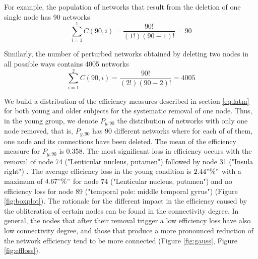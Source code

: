 \documentclass[12pt,a4paper]{article}
\begin{document}
For example, the population of networks that result from the deletion of one single node has 90 networks 
\begin{equation*}
\sum_{i=1}^{1}
C(90,i) = \frac{90!} {(1!)(90-1)!} = 90
\end{equation*}

Similarly, the number of perturbed networks obtained by deleting two nodes in all possible ways contains 4005 networks
\begin{equation*}
\sum_{i=1}^{2} C(90,i)=
 \frac{90!} {(2!)(90-2)!} = 4005
\end{equation*}

We build a distribution of the efficiency measures described in section \ref{eq:latm}
for both young and older subjects for the systematic removal of one node. Thus, in the young group, we denote $P_{y, 90}$ the distribution of networks with only one node removed, that is, $P_{y, 90}$ has 90 different networks where for each of of them, one node and its connections have been deleted. 
The mean of the efficiency measure for $P_{y, 90}$ is 0.358. 
The most significant loss in efficiency occurs with the removal of node 74 ("Lenticular nucleus, putamen") followed by node 31 ("Insula right") . 
The average efficiency loss in the young condition is $2.44"\%" $ with a maximum of  $4.67"\%" $ for node 74 ("Lenticular nucleus, putamen") and no efficiency loss for node 89 ("temporal pole: middle temporal gyrus") (Figure \ref{fig:boxplot}). The rationale for the different impact in the efficiency caused by the obliteration of certain nodes can be found in the connectivity degree. In general, the nodes that after their removal trigger a low efficiency loss have also low connectivity degree, and those that produce a more pronounced reduction of the network efficiency tend to be more connected (Figure \ref{fig:gauss}, Figure \ref{fig:effloss}). 
\end{document}
